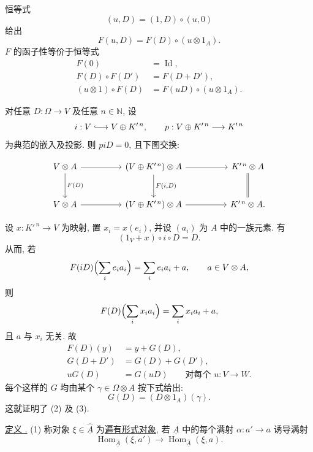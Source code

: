 恒等式
\[
 (u,D)=(1,D)\circ(u,0)
\]
给出
\[
 F(u,D)=F(D)\circ(u\otimes1_A).
\]
$F$ 的函子性等价于恒等式
\[
\begin{aligned}
 F(0)&=\operatorname{Id},\\
 F(D)\circ F(D')&=F(D+D'),\\
 (u\otimes1)\circ F(D)
   &=F(uD)\circ(u\otimes1_A).
\end{aligned}
\]

对任意 $D:\Omega\longrightarrow V$ 及任意 $n\in\mathbb N$, 设
\[
 i:V\lhook\joinrel\longrightarrow V\oplus K'^{\,n},
 \qquad
 p:V\oplus K'^{\,n}\longrightarrow K'^{\,n}
\]
为典范的嵌入及投影. 则 $piD=0$, 且下图交换:


\[
\begin{tikzcd}[column sep=huge,row sep=large]
 V\otimes A
   \arrow[r]
   \arrow[d,"{F(D)}"]
 & (V\oplus K'^{\,n})\otimes A
   \arrow[r]
   \arrow[d,"{F(i,D)}"]
 & K'^{\,n}\otimes A
   \arrow[d,equal]\\
 V\otimes A
   \arrow[r]
 & (V\oplus K'^{\,n})\otimes A
   \arrow[r]
 & K'^{\,n}\otimes A.
\end{tikzcd}
\]

设 $x:K'^{\,n}\longrightarrow V$ 为映射, 置 $x_i=x(e_i)$,
并设 $(a_i)$ 为 $A$ 中的一族元素. 有
\[
 (1_V+x)\circ i\circ D=D.
\]
从而, 若
\[
 F(iD)\Bigl(\sum_i e_i a_i\Bigr)
 =\sum_i e_i a_i+a,
 \qquad a\in V\otimes A,
\]
则
\[
 F(D)\Bigl(\sum_i x_i a_i\Bigr)
 =\sum_i x_i a_i+a,
\]
且 $a$ 与 $x_i$ 无关. 故
\[
\begin{aligned}
 F(D)(y)&=y+G(D),\\
 G(D+D')&=G(D)+G(D'),\\
 uG(D)&=G(uD)
   \qquad\text{对每个 }u:V\longrightarrow W.
\end{aligned}
\]
每个这样的 $G$ 均由某个 $\gamma\in\Omega\otimes A$ 按下式给出:
\[
 G(D)=(D\otimes1_A)(\gamma).
\]
这就证明了 (2) 及 (3).


\underline{定义 .}
(1) 称对象 $\xi\in\widehat{\underline A}$ 为\underline{遍有形式对象},
若 $\underline A$ 中的每个满射 $\alpha:a'\longrightarrow a$ 诱导满射
\[
 \operatorname{Hom}_{\widehat{\underline A}}(\xi,a')
 \longrightarrow
 \operatorname{Hom}_{\widehat{\underline A}}(\xi,a).
\]

